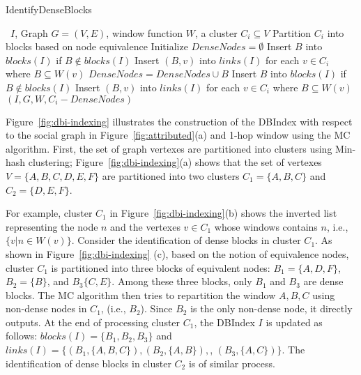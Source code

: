 \begin{algorithm}
\caption{IdentifyDenseBlocks}
\begin{algorithmic}[1] \small
\Require \DBIndex\ $I$, Graph $G=(V,E)$, window function $W$, a cluster $C_i \subseteq V$
\State Partition $C_i$ into blocks based on node equivalence
\State Initialize $DenseNodes = \emptyset$
	\State Insert $B$ into $blocks(I)$ if $B \not\in blocks(I)$
	\State Insert $(B,v)$ into $links(I)$ for each $v \in C_i$ where $B \subseteq W(v)$
	\State $DenseNodes = DenseNodes \cup B$
\EndFor
{}
		\State Insert $B$ into $blocks(I)$ if $B \not\in blocks(I)$
		\State Insert $(B,v)$ into $links(I)$ for each $v \in C_i$ where $B \subseteq W(v)$
	\EndFor
{}
		 $(I,G,W,C_i - DenseNodes)$
	\EndIf
\EndIf
\end{algorithmic}
\label{algo:identify}
\end{algorithm}

Figure~\ref{fig:dbi-indexing} 
illustrates the construction of the DBIndex with respect to the social graph in 
Figure~\ref{fig:attributed}(a) and 1-hop window using the MC algorithm.
First, the set of graph vertexes are partitioned into clusters using Min-hash clustering;
Figure~\ref{fig:dbi-indexing}(a)
shows that the set of vertexes $V = \{A, B, C, D, E, F \}$ are partitioned into two clusters $C_1=\{A, B, C\}$ and $C_2=\{D, E, F\}$. 

For example, cluster $C_1$ in 
Figure~\ref{fig:dbi-indexing}(b) shows the inverted list representing
the node $n$ and the vertexes $v \in C_1$ whose windows contains $n$, i.e., $\{v | n \in W(v) \}$.
%
Consider the identification of dense blocks in cluster $C_1$.
As shown in Figure~\ref{fig:dbi-indexing} (c), based on the notion of equivalence nodes,
cluster $C_1$ is partitioned into three blocks of equivalent nodes:
$B_1=\{A,D,F\}$, $B_2=\{B\}$, and $B_3\{C,E\}$.
Among these three blocks, only
$B_1$ and $B_3$ are dense blocks.
The MC algorithm then tries to repartition the window $A,B,C$ using non-dense nodes in $C_1$,
(i.e., $B_2$). Since $B_2$ is the only non-dense node, it directly outputs.
At the end of processing cluster $C_1$,
the DBIndex $I$ is updated as follows:
$blocks(I) = \{B_1, B_2, B_3\}$ 
and
$links(I) = \{ (B_1,\{A,B,C\}), (B_2, \{A,B\}),$, $(B_3, \{A,C\}) \}$. 
The identification of dense blocks in cluster $C_2$ 
is of similar process.

